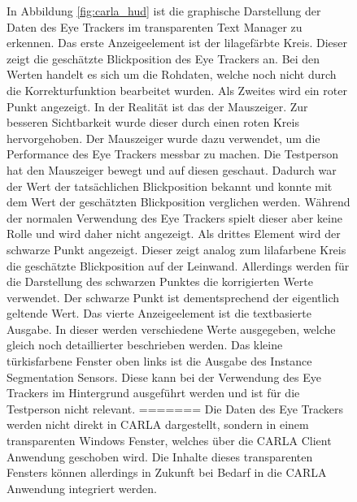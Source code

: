 \begin{figure}[h]
In Abbildung \ref{fig:carla_hud} ist die graphische Darstellung der Daten des Eye Trackers im transparenten Text Manager zu erkennen. Das erste Anzeigeelement ist der lilagefärbte Kreis. Dieser zeigt die geschätzte Blickposition des Eye Trackers an. Bei den Werten handelt es sich um die Rohdaten, welche noch nicht durch die Korrekturfunktion bearbeitet wurden. Als Zweites wird ein roter Punkt angezeigt. In der Realität ist das der Mauszeiger. Zur besseren Sichtbarkeit wurde dieser durch einen roten Kreis hervorgehoben. Der Mauszeiger wurde dazu verwendet, um die Performance des Eye Trackers messbar zu machen. Die Testperson hat den Mauszeiger bewegt und auf diesen geschaut. Dadurch war der Wert der tatsächlichen Blickposition bekannt und konnte mit dem Wert der geschätzten Blickposition verglichen werden. Während der normalen Verwendung des Eye Trackers spielt dieser aber keine Rolle und wird daher nicht angezeigt. Als drittes Element wird der schwarze Punkt angezeigt. Dieser zeigt analog zum lilafarbene Kreis die geschätzte Blickposition auf der Leinwand. Allerdings werden für die Darstellung des schwarzen Punktes die korrigierten Werte verwendet. Der schwarze Punkt ist dementsprechend der eigentlich geltende Wert. Das vierte Anzeigeelement ist die textbasierte Ausgabe. In dieser werden verschiedene Werte ausgegeben, welche gleich noch detaillierter beschrieben werden. Das kleine türkisfarbene Fenster oben links ist die Ausgabe des Instance Segmentation Sensors. Diese kann bei der Verwendung des Eye Trackers im Hintergrund ausgeführt werden und ist für die Testperson nicht relevant.
=======
Die Daten des Eye Trackers werden nicht direkt in CARLA dargestellt, sondern in einem transparenten Windows Fenster, welches über die CARLA Client Anwendung geschoben wird. Die Inhalte dieses transparenten Fensters können allerdings in Zukunft bei Bedarf in die CARLA Anwendung integriert werden.


\end{figure}
